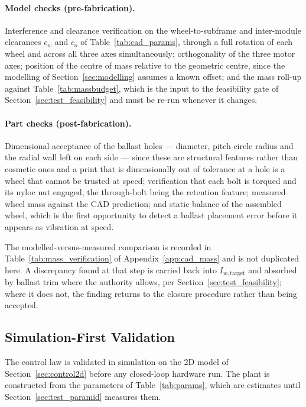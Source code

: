 \paragraph{Model checks (pre-fabrication).} Interference and clearance
verification on the wheel-to-subframe and inter-module clearances $c_w$ and $c_o$
of Table~\ref{tab:cad_params}, through a full rotation of each wheel and across
all three axes simultaneously; orthogonality of the three motor axes; position of
the centre of mass relative to the geometric centre, since the modelling of
Section~\ref{sec:modelling} assumes a known offset; and the mass roll-up against
Table~\ref{tab:massbudget}, which is the input to the feasibility gate of
Section~\ref{sec:test_feasibility} and must be re-run whenever it changes.

\paragraph{Part checks (post-fabrication).} Dimensional acceptance of the ballast
holes --- diameter, pitch circle radius and the radial wall left on each side ---
since these are structural features rather than cosmetic ones and a print that is
dimensionally out of tolerance at a hole is a wheel that cannot be trusted at
speed; verification that each bolt is torqued and its nyloc nut engaged, the
through-bolt being the retention feature; measured wheel mass against the CAD
prediction; and static balance of the assembled wheel, which is the first
opportunity to detect a ballast placement error before it appears as vibration at
speed.

The modelled-versus-measured comparison is recorded in
Table~\ref{tab:mass_verification} of Appendix~\ref{app:cad_mass} and is not
duplicated here. A discrepancy found at that step is carried back into
$I_{w,\text{target}}$ and absorbed by ballast trim where the authority allows,
per Section~\ref{sec:test_feasibility}; where it does not, the finding returns to
the closure procedure rather than being accepted.

\subsection{Simulation-First Validation}
\label{sec:test_sim}

The control law is validated in simulation on the 2D model of
Section~\ref{sec:control2d} before any closed-loop hardware run. The plant is
constructed from the parameters of Table~\ref{tab:params}, which are estimates
until Section~\ref{sec:test_paramid} measures them.

